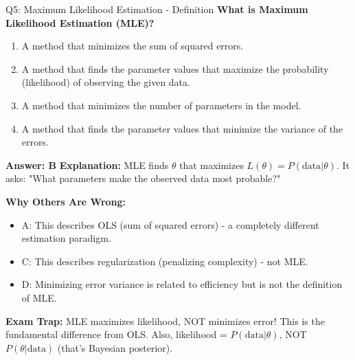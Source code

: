 \documentclass[8pt]{beamer}
\begin{document}
	\begin{frame}{Q5: Maximum Likelihood Estimation - Definition}
		\fontsize{6.5}{7.5}\selectfont
		\textbf{What is Maximum Likelihood Estimation (MLE)?}
		
		\begin{enumerate}
			\item A method that minimizes the sum of squared errors.
			\item A method that finds the parameter values that maximize the probability (likelihood) of observing the given data.
			\item A method that minimizes the number of parameters in the model.
			\item A method that finds the parameter values that minimize the variance of the errors.
		\end{enumerate}
		
		\vspace{0.05cm}
		\textcolor{myblue}{\textbf{Answer: B}}
		\vspace{0.05cm}
		\textcolor{myblue}{\textbf{Explanation:}} MLE finds $\theta$ that maximizes $L(\theta) = P(\text{data}|\theta)$. It asks: "What parameters make the observed data most probable?"
		
		\vspace{0.05cm}
		\textcolor{myred}{\textbf{Why Others Are Wrong:}}
		\begin{itemize}
			\item \textcolor{myred}{A:} This describes OLS (sum of squared errors) - a completely different estimation paradigm.
			\item \textcolor{myred}{C:} This describes regularization (penalizing complexity) - not MLE.
			\item \textcolor{myred}{D:} Minimizing error variance is related to efficiency but is not the definition of MLE.
		\end{itemize}
		
		\textcolor{myred}{\textbf{Exam Trap:}} MLE maximizes \textcolor{myblue}{likelihood}, NOT minimizes error! This is the fundamental difference from OLS. Also, likelihood = $P(\text{data}|\theta)$, NOT $P(\theta|\text{data})$ (that's Bayesian posterior).
	\end{frame}
	
\end{document}
